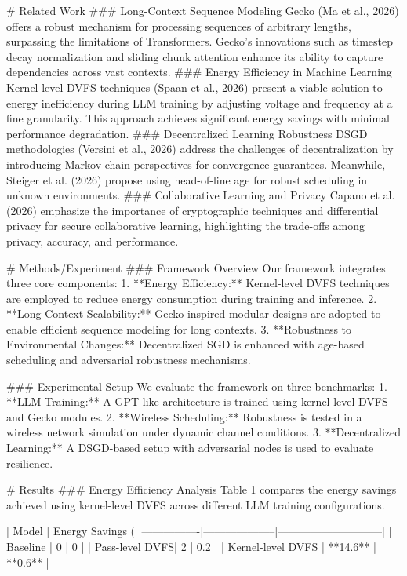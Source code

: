 # Related Work  
### Long-Context Sequence Modeling  
Gecko (Ma et al., 2026) offers a robust mechanism for processing sequences of arbitrary lengths, surpassing the limitations of Transformers. Gecko's innovations such as timestep decay normalization and sliding chunk attention enhance its ability to capture dependencies across vast contexts.  
### Energy Efficiency in Machine Learning  
Kernel-level DVFS techniques (Spaan et al., 2026) present a viable solution to energy inefficiency during LLM training by adjusting voltage and frequency at a fine granularity. This approach achieves significant energy savings with minimal performance degradation.  
### Decentralized Learning Robustness  
DSGD methodologies (Versini et al., 2026) address the challenges of decentralization by introducing Markov chain perspectives for convergence guarantees. Meanwhile, Steiger et al. (2026) propose using head-of-line age for robust scheduling in unknown environments.  
### Collaborative Learning and Privacy  
Capano et al. (2026) emphasize the importance of cryptographic techniques and differential privacy for secure collaborative learning, highlighting the trade-offs among privacy, accuracy, and performance.  

# Methods/Experiment  
### Framework Overview  
Our framework integrates three core components:  
1. **Energy Efficiency:** Kernel-level DVFS techniques are employed to reduce energy consumption during training and inference.  
2. **Long-Context Scalability:** Gecko-inspired modular designs are adopted to enable efficient sequence modeling for long contexts.  
3. **Robustness to Environmental Changes:** Decentralized SGD is enhanced with age-based scheduling and adversarial robustness mechanisms.  

### Experimental Setup  
We evaluate the framework on three benchmarks:  
1. **LLM Training:** A GPT-like architecture is trained using kernel-level DVFS and Gecko modules.  
2. **Wireless Scheduling:** Robustness is tested in a wireless network simulation under dynamic channel conditions.  
3. **Decentralized Learning:** A DSGD-based setup with adversarial nodes is used to evaluate resilience.  

# Results  
### Energy Efficiency Analysis  
Table 1 compares the energy savings achieved using kernel-level DVFS across different LLM training configurations.  

| Model          | Energy Savings (%
|----------------|--------------------|-----------------------------|  
| Baseline       | 0                 | 0                           |  
| Pass-level DVFS| 2                 | 0.2                         |  
| Kernel-level DVFS | **14.6**       | **0.6**                     |  


